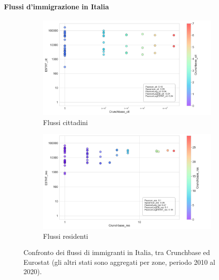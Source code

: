 \paragraph{Flussi d'immigrazione in Italia}
\label{toIta_flows}
\begin{figure}[tb]
    \centering
    \begin{subfigure}{\textwidth}
        \centering
        \includegraphics[width=1.0\textwidth]{images/flows/aggregated/filtered_destination/ita/ESTAT_cit_True.png}
        \caption{Flussi cittadini}
        \label{fig:italia_dest_true_cit}
    \end{subfigure}
    \begin{subfigure}{\textwidth}
        \includegraphics[width=1.0\textwidth]{images/flows/aggregated/filtered_destination/ita/ESTAT_res_True.png}
        \caption{Flussi residenti}
        \label{fig:italia_dest_true_res}
    \end{subfigure}
    \caption{Confronto dei flussi di immigranti in Italia, tra Crunchbase ed Eurostat (gli altri stati sono aggregati per zone, periodo 2010 al 2020).}
\end{figure}
